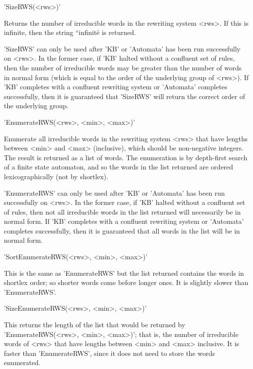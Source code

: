 'SizeRWS(<rws>)'

Returns the number of irreducible words in the rewriting system <rws>.
If this is infinite, then the string {``infinite\"} is returned.

'SizeRWS'   can only be  used  after 'KB'  or  'Automata' has been run
successfully  on <rws>. In  the former case, if  'KB' halted without a
confluent  set of rules, then the  number of  irreducible words may be
greater than the number of words in normal form (which is equal to the
order  of the underlying group  of  <rws>).  If 'KB'  completes with a
confluent rewriting system  or 'Automata' completes successfully, then
it is  guaranteed that 'SizeRWS' will  return the correct order of the
underlying group.

\vspace{5mm}
'EnumerateRWS(<rws>, <min>, <max>)'

Enumerate  all  irreducible words in  the  rewriting system <rws> that
have   lengths between <min> and <max>    (inclusive), which should be
non-negative integers.    The result is returned  as  a list of words.
The enumeration is by depth-first search  of a finite state automaton,
and so  the words in the  list returned  are ordered lexicographically
(not by shortlex).

'EnumerateRWS' can only be used after 'KB'  or 'Automata' has been run
successfully on <rws>. In  the former case,  if 'KB' halted  without a
confluent set of  rules, then not all irreducible   words in the  list
returned will necessarily be in normal form.  If 'KB' completes with a
confluent rewriting  system or 'Automata' completes successfully, then
it is guaranteed that all words in the list will be in normal form.

\vspace{5mm}
'SortEnumerateRWS(<rws>, <min>, <max>)'

This is the same as 'EnumerateRWS' but the  list returned contains the
words in shortlex order; so shorter words  come before longer ones. It
is slightly slower than 'EnumerateRWS'.

\vspace{5mm}
'SizeEnumerateRWS(<rws>, <min>, <max>)'

This   returns the length   of  the list   that  would be returned  by
'EnumerateRWS(<rws>,  <min>,   <max>)';    that is,  the    number  of
irreducible words of <rws>  that have lengths  between <min> and <max>
inclusive. It is faster than 'EnumerateRWS', since it does not need to
store the words enumerated.

